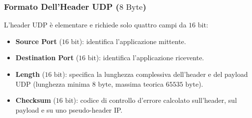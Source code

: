 \documentclass[11pt, a4paper]{article}
\begin{document}
\subsubsection{Formato Dell'Header UDP ($8\text{ Byte}$)}
L'header UDP è elementare e richiede solo quattro campi da $16\text{ bit}$:
\begin{itemize}[noitemsep]
    \item \textbf{Source Port} ($16\text{ bit}$): identifica l'applicazione mittente.
    \item \textbf{Destination Port} ($16\text{ bit}$): identifica l'applicazione ricevente.
    \item \textbf{Length} ($16\text{ bit}$): specifica la lunghezza complessiva dell'header e del payload UDP (lunghezza minima $8\text{ byte}$, massima teorica $65535\text{ byte}$).
    \item \textbf{Checksum} ($16\text{ bit}$): codice di controllo d'errore calcolato sull'header, sul payload e su uno pseudo-header IP.
\end{itemize}
\end{document}
